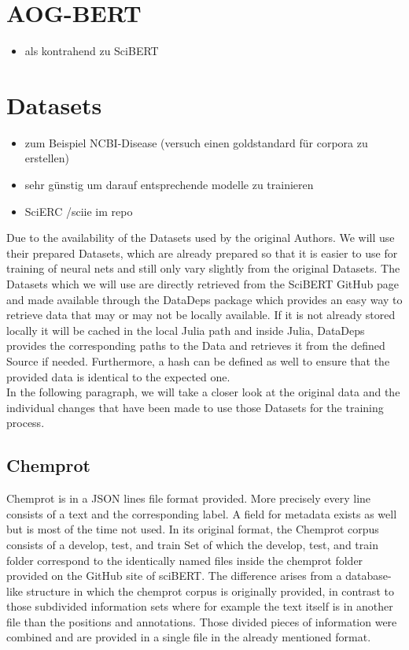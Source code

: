 \section{AOG-BERT}
\begin{itemize}
	\item als kontrahend zu SciBERT \cite{Liu2021}
\end{itemize}
\section{Datasets}
\begin{itemize}
	\item zum Beispiel NCBI-Disease (versuch einen goldstandard für corpora zu erstellen)
	\item sehr günstig um darauf entsprechende modelle zu trainieren \cite{Dogan2014}
	\item SciERC /sciie im repo \cite{luan2018multitask}
\end{itemize}
Due to the availability of the Datasets used by the original Authors. We will use their prepared Datasets, which are already prepared so that it is easier to use for training of neural nets and still only vary slightly from the original Datasets. The Datasets which we will use are directly retrieved from the SciBERT GitHub page and made available through the DataDeps package which provides an easy way to retrieve data that may or may not be locally available. If it is not already stored locally it will be cached in the local Julia path and inside Julia, DataDeps provides the corresponding paths to the Data and retrieves it from the defined Source if needed. Furthermore, a hash can be defined as well to ensure that the provided data is identical to the expected one.\cite{White2019}\\
In the following paragraph, we will take a closer look at the original data and the individual changes that have been made to use those Datasets for the training process.
\subsection{Chemprot}
Chemprot is in a JSON lines file format provided. More precisely every line consists of a text and the corresponding label. A field for metadata exists as well but is most of the time not used. In its original format, the Chemprot corpus consists of a develop, test, and train Set of which the develop, test, and train folder correspond to the identically named files inside the chemprot folder provided on the GitHub site of sciBERT. The difference arises from a database-like structure in which the chemprot corpus is originally provided, in contrast to those subdivided information sets where for example the text itself is in another file than the positions and annotations. Those divided pieces of information were combined and are provided in a single file in the already mentioned format. \cite{Beltagy2019,Wang2016}